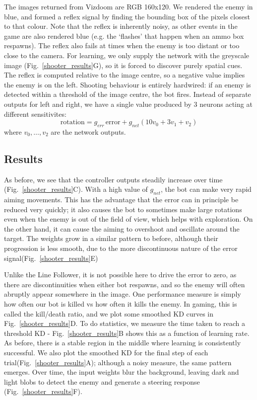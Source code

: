 \documentclass{llncs}
\begin{document}
The images returned from Vizdoom are RGB 160x120. We rendered the enemy in blue, and formed a reflex signal by finding the bounding box of the pixels closest to that colour. Note that the reflex is inherently noisy, as other events in the game are also rendered blue (e.g. the ‘flashes’ that happen when an ammo box respawns). The reflex also fails at times when the enemy is too distant or too close to the camera. For learning, we only supply the network with the greyscale image (Fig.~\ref{shooter_results}G), so it is forced to discover purely spatial cues. The reflex is computed relative to the image centre, so a negative value implies the enemy is on the left. Shooting behaviour is entirely hardwired: if an enemy is detected within a threshold of the image centre, the bot fires. Instead of separate outputs for left and right, we have a single value produced by 3 neurons acting at different sensitivites:
\begin{equation}
\mathrm{rotation} = g_{err}\, \mathrm{error} + g_{net} \left( 10 v_0 + 3 v_1 + v_2 \right)
\end{equation}
where $v_0, \ldots, v_2$ are the network outputs.



\subsection{Results}

As before, we see that the controller outputs steadily increase over time (Fig.~\ref{shooter_results}C). With a high value of $g_{net}$, the bot can make very rapid aiming movements. This has the advantage that the error can in principle be reduced very quickly; it also causes the bot to sometimes make large rotations even when the enemy is out of the field of view, which helps with exploration. On the other hand, it can cause the aiming to overshoot and oscillate around the target. 
The weights grow in a similar pattern to before, although their progression is less smooth, due to the more discontinuous nature of the error signal(Fig.~\ref{shooter_results}E)

Unlike the Line Follower, it is not possible here to drive the error to zero, as there are discontinuities when either bot respawns, and so the enemy will often abruptly appear somewhere in the image. One performance measure is simply how often our bot is killed vs how often it kills the enemy. In gaming, this is called the kill/death ratio, and we plot some smoothed KD curves in Fig.~\ref{shooter_results}D. To do statistics, we measure the time taken to reach a threshold KD - Fig.~\ref{shooter_results}B shows this as a function of learning rate. As before, there is a stable region in the middle where learning is consistently successful. We also plot the smoothed KD for the final step of each trial(Fig.~\ref{shooter_results}A); although a noisy measure, the same pattern emerges. Over time, the input weights blur the background, leaving dark and light blobs to detect the enemy and generate a steering response (Fig.~\ref{shooter_results}F).
\end{document}
